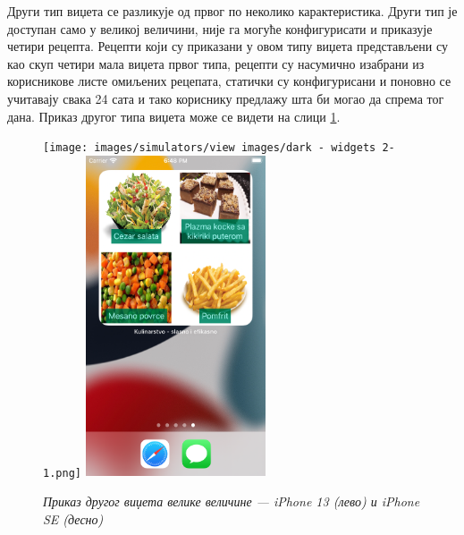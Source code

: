 \documentclass[12pt,oneside]{memoir}
\begin{document}
\indent Други тип виџета се разликује од првог по неколико карактеристика. Други тип је доступан само у великој величини, није га могуће конфигурисати и приказује четири рецепта. Рецепти који су приказани у овом типу виџета представљени су као скуп четири мала виџета првог типа, рецепти су насумично изабрани из корисникове листе омиљених рецепата, статички су конфигурисани и поновно се учитавају свака 24 сата и тако кориснику предлажу шта би могао да спрема тог дана. Приказ другог типа виџета може се видети на слици \ref{slika:приказ_виџета_3_1}.

\begin{figure} [H]
    \centering
    \captionsetup{justification=centering}
    \texttt{[image: images/simulators/view images/dark - widgets 2-1.png]} 
    \hfill
    \includegraphics[width=0.475\textwidth]{images/simulators/view images/light - widgets 2-1.png}
    \caption{\textit{Приказ другог виџета велике величине --- iPhone 13 (лево) и iPhone SE (десно)}}
    \label{slika:приказ_виџета_3_1}
\end{figure}

\end{document}

